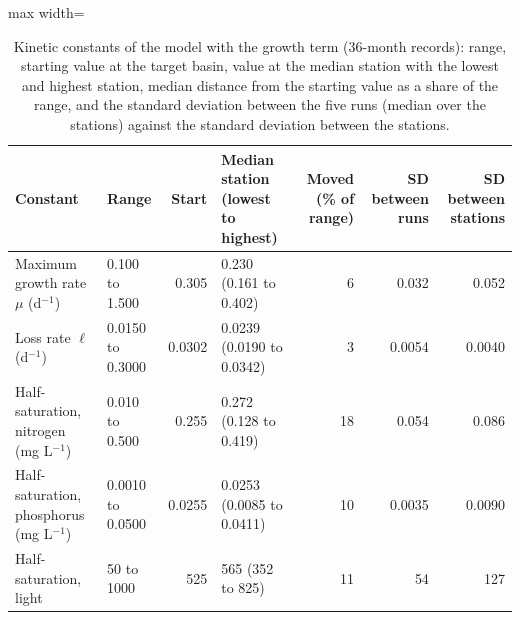\begin{table}[tbp]
\centering
\caption{Kinetic constants of the model with the growth term (36-month records): range, starting value at the target basin, value at the median station with the lowest and highest station, median distance from the starting value as a share of the range, and the standard deviation between the five runs (median over the stations) against the standard deviation between the stations.}
\label{tab:S_growth}
\footnotesize
\setlength{\tabcolsep}{3.5pt}
\begin{adjustbox}{max width=\textwidth}
\begin{tabular}{llrlrrr}
\toprule
Constant & Range & Start & Median station (lowest to highest) & Moved (\% of range) & SD between runs & SD between stations \\
\midrule
Maximum growth rate $\mu$ (d$^{-1}$) & 0.100 to 1.500 & 0.305 & 0.230 (0.161 to 0.402) & 6 & 0.032 & 0.052 \\
Loss rate $\ell$ (d$^{-1}$) & 0.0150 to 0.3000 & 0.0302 & 0.0239 (0.0190 to 0.0342) & 3 & 0.0054 & 0.0040 \\
Half-saturation, nitrogen (mg L$^{-1}$) & 0.010 to 0.500 & 0.255 & 0.272 (0.128 to 0.419) & 18 & 0.054 & 0.086 \\
Half-saturation, phosphorus (mg L$^{-1}$) & 0.0010 to 0.0500 & 0.0255 & 0.0253 (0.0085 to 0.0411) & 10 & 0.0035 & 0.0090 \\
Half-saturation, light & 50 to 1000 & 525 & 565 (352 to 825) & 11 & 54 & 127 \\
\bottomrule
\end{tabular}
\end{adjustbox}
\end{table}
